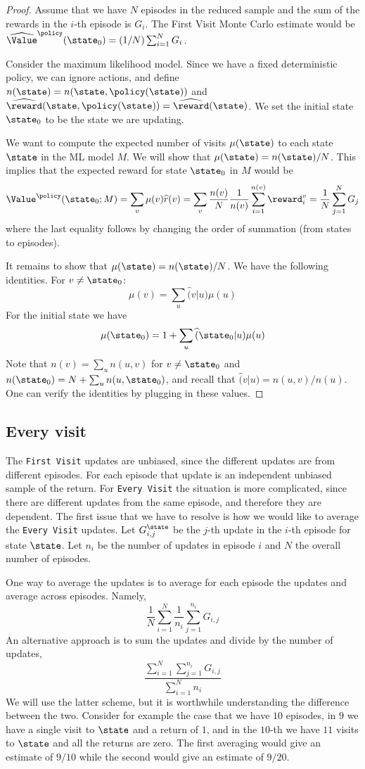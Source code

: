 \begin{proof}
Assume that we have $N$ episodes in the reduced sample and the sum
of the rewards in the $i$-th episode is $G_i$. The First Visit Monte
Carlo estimate would be
$\widehat{\Value}^\policy(\state_0)=(1/N)\sum_{i=1}^N G_i$.

Consider the maximum likelihood model. Since we have a fixed
deterministic policy, we can ignore actions, and define
$n(\state)=n(\state,\policy(\state))$ and
$\widehat{\reward}(\state,\policy(\state))=\widehat{\reward}(\state)$.
We set the initial state $\state_0$ to be the state we are updating.

We want to compute the expected number of visits $\mu(\state)$ to
each state $\state$ in the ML model $M$. We will show that
$\mu(\state)=n(\state)/N$. This implies that the expected reward for
state $\state_0$ in $M$ would be
\[
\Value^\policy(\state_0;M)=\sum_v \mu(v) \widehat{r}(v)=\sum_v
\frac{n(v)}{N}\frac{1}{n(v)}\sum_{i=1}^{n(v)} \reward_i^v =
\frac{1}{N}\sum_{j=1}^N G_j
\]
where the last equality follows by changing the order of summation
(from states to episodes).

It remains to show that $\mu(\state)=n(\state)/N$. We have the
following identities. For $v\neq \state_0$:
\[
\mu(v)=\sum_u \widehat(v|u)\mu(u)
\]
For the initial state we have
\[
\mu(\state_0)=1+ \sum_u \widehat(\state_0|u)\mu(u)
\]
Note that $n(v)=\sum_u n(u,v)$ for $v\neq \state_0$ and
$n(\state_0)=N+\sum_u n(u,\state_0)$, and recall that
$\widehat(v|u)=n(u,v)/n(u)$. One can verify the identities by
plugging in these values.
\end{proof}

\subsection{Every visit}

The {\tt First Visit} updates are unbiased, since the different
updates are from different episodes. For each episode that update is
an independent unbiased sample of the return.
%
For {\tt Every Visit} the situation is more complicated, since there
are different updates from the same episode, and therefore they are
dependent. The first issue that we have to resolve is how we would like
to average the {\tt Every Visit} updates. Let $G^\state_{i,j}$
be the $j$-th update in the $i$-th episode for state $\state$. Let
$n_i$ be the number of updates in episode $i$ and $N$ the overall
number of episodes.

One way to average the updates is to average for each episode the
updates and average across episodes. Namely,
\[
\frac{1}{N}\sum_{i=1}^N \frac{1}{n_i} \sum_{j=1}^{n_i} G_{i,j}
\]
An alternative approach is to sum the updates and divide by the
number of updates,
\[
\frac{\sum_{i=1}^N\sum_{j=1}^{n_i} G_{i,j}}{\sum_{i=1}^N n_i}
\]
We will use the latter scheme, but it is worthwhile understanding
the difference between the two. Consider for example the case that
we have $10$ episodes, in $9$ we have a single visit to $\state$ and
a return of $1$, and in the $10$-th we have $11$ visits to $\state$
and all the returns are zero. The first averaging would give an
estimate of $9/10$ while the second would give an estimate of
$9/20$.

